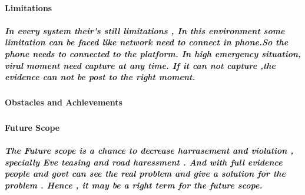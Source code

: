 \documentclass{article}
\begin{document}
\paragraph{Limitations}
\subparagraph{In every system their's still limitations , In this environment some limitation can be faced like network need to connect in phone.So the phone needs to connected to the platform. In high emergency situation, viral moment need capture at any time. If it can not capture ,the evidence can not be post to the 
right moment.}

\paragraph{Obstacles and Achievements}
\subparagraph{}


\paragraph{Future Scope}
\subparagraph{The Future scope is a chance to decrease harrasement and violation , specially Eve teasing and road haressment . And with full evidence people and govt can see the real problem and give a solution for the problem . Hence , it may be a right term for the future scope. }
\end{document}
